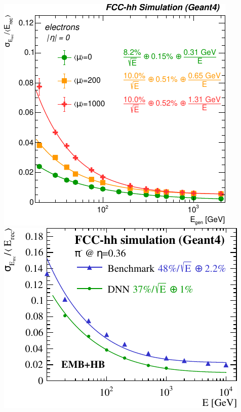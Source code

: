 \documentclass[aspectratio=169]{beamer}
\begin{document}
\begin{frame}
\begin{columns}[c]
    \includegraphics[width=.8\linewidth]{figures/FCC_hh_LAr_electron_performance_mu.pdf}
    \includegraphics[width=.8\linewidth]{figures/FCC_hh_LAr_pion_performance.pdf}
  \end{columns}
\end{frame}
\end{document}
